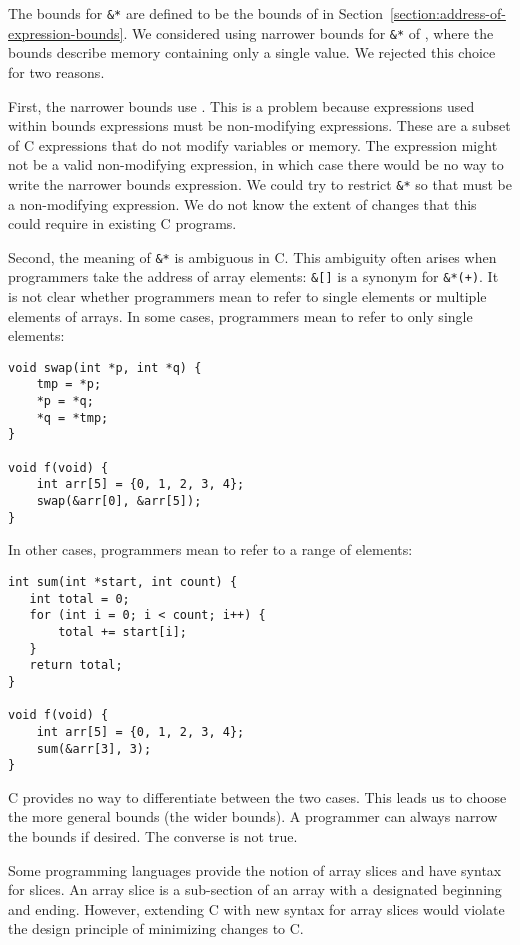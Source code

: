 The bounds for \lstinline|&*| are defined to be the bounds of  in 
Section~\ref{section:address-of-expression-bounds}.  We considered
using narrower bounds for \lstinline|&*| of ,
where the bounds describe memory containing only a single value.
We rejected this choice for two reasons.

First, the narrower bounds use .  This is a problem because expressions used within
bounds expressions must be non-modifying expressions. These are a subset of C expressions that do 
not modify variables or memory.  The expression  might not be a valid non-modifying 
expression, in which case there would be no way to write the narrower bounds expression.  We could try to restrict \lstinline|&*| so that  must be a non-modifying expression.  We do not know
the extent of changes that this could require in existing C programs.

Second, the meaning of \lstinline|&*| is ambiguous in C.   This ambiguity often
arises when programmers take the address of array elements: \lstinline|&|\lstinline|[|\lstinline|]|
is a synonym for \lstinline|&*|\lstinline|(|\lstinline|+|\lstinline|)|.  It is not clear whether
programmers mean to refer to single elements or multiple elements of arrays.
In some cases, programmers mean
to refer to only single elements:
\begin{lstlisting}
void swap(int *p, int *q) {
    tmp = *p;
    *p = *q;
    *q = *tmp;
}

void f(void) {
    int arr[5] = {0, 1, 2, 3, 4};
    swap(&arr[0], &arr[5]);
}
\end{lstlisting}

In other cases, programmers mean to refer to a range of elements:
\begin{lstlisting}
int sum(int *start, int count) {
   int total = 0;
   for (int i = 0; i < count; i++) {
       total += start[i];
   }
   return total;
}

void f(void) {
    int arr[5] = {0, 1, 2, 3, 4};
    sum(&arr[3], 3);
}
\end{lstlisting}

C provides no way to differentiate between the two cases. 
This leads us to choose the more general bounds (the wider bounds).
A programmer can always narrow the bounds if desired.  The converse is not
true.

Some programming languages provide the notion of array slices and have syntax for slices. 
An array slice is a sub-section of an array with a designated beginning and ending.
However, extending C with new syntax for array slices would violate the design
principle of minimizing changes to C.

